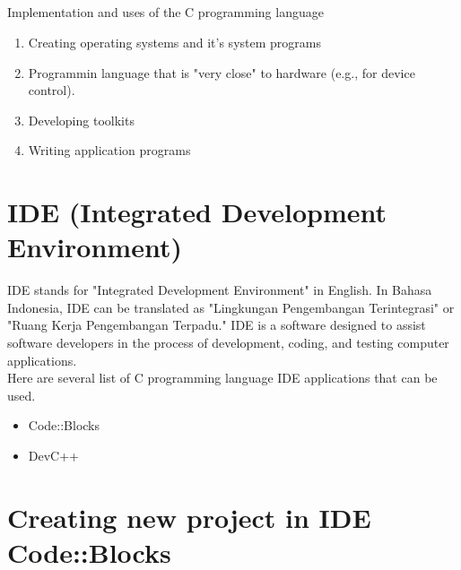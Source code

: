\subsection*{}Implementation and uses of the C programming language
\begin{enumerate}
	\item Creating operating systems and it's system programs
    \item Programmin language that is "very close" to hardware (e.g., for device control).
    \item Developing toolkits
    \item Writing application programs
\end{enumerate}
\section{IDE (Integrated Development Environment)}
IDE stands for "Integrated Development Environment" in English. In Bahasa Indonesia, IDE can be translated as "Lingkungan Pengembangan Terintegrasi" or "Ruang Kerja Pengembangan Terpadu." IDE is a software designed to assist software developers in the process of development, coding, and testing computer applications.
\\ 
Here are several list of C programming language IDE applications that can be used.
\begin{itemize}
	\item Code::Blocks
	\item DevC++
\end{itemize}
\section{Creating new project in IDE Code::Blocks} 
